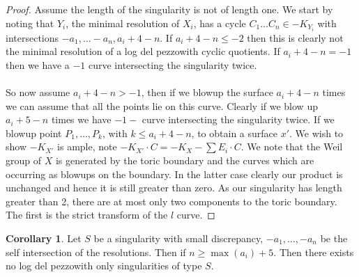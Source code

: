 \documentclass[11pt]{report}
\theoremstyle{definition}
\theoremstyle{definition}
\newtheorem{cor}[thm]{Corollary}
\theoremstyle{definition}
\theoremstyle{definition}
\theoremstyle{definition}
\theoremstyle{definition}
\theoremstyle{definition}
\theoremstyle{definition}
\newcommand{\ldp}{log del pezzo}
\begin{document}
\begin{proof}
Assume the length of the singularity is not of length one. We start by noting that $Y_i$, the minimal resolution of $X_i$, has a cycle $C_1 \dots C_n \in -K_{Y_i}$ with intersections $-a_1, \dots -a_n, a_i+4-n$. If $a_i+4 -n \leq -2$ then this is clearly not the minimal resolution of a \ldp with cyclic quotients. If $a_i+4-n = -1$ then we have a $-1$ curve intersecting the singularity twice. 
\\
\\
So now assume $a_i + 4-n > -1$, then if we blowup the surface $a_i + 4 -n $ times we can assume that all the points lie on this curve. Clearly if we blow up $a_i + 5 - n$ times we have $-1-$ curve intersecting the singularity twice. If we blowup point $P_1, \dots, P_k$, with $k \leq a_i + 4 - n$, to obtain a surface $x'$. We wish to show $-K_{X'}$ is ample, note $-K_{X'}\cdot C = -K_{X} - \sum{E_i} \cdot C$. We note that the Weil group of $X$ is generated by the toric boundary and the curves which are occurring as blowups on the boundary. In the latter case clearly our product is unchanged and hence it is still greater than zero. As our singularity has length greater than 2, there are at most only two components to the toric boundary. The first is the strict transform of the $l$ curve. 
\end{proof}
\begin{cor}
Let $S$ be a singularity with small discrepancy, $-a_1, \dots , -a_n$ be the self intersection of the resolutions. Then if $n \geq \max (a_i) + 5 $. Then there exists no \ldp with only singularities of type $S$.
\end{cor}
\end{document}
